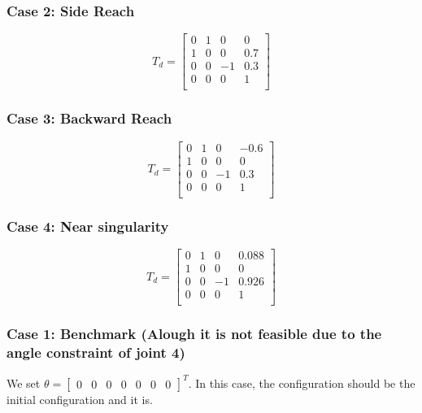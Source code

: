 \documentclass[english,10pt,a4paper]{book}
\begin{document}
    \subsubsection*{Case 2: Side Reach}
    $$T_d = \begin{bmatrix}
    	0 & 1 & 0 & 0\\
    	1 & 0 & 0 & 0.7\\
    	0 & 0 & -1 & 0.3 \\
    	0 & 0 & 0 & 1 \\
    \end{bmatrix}$$
    
    \subsubsection*{Case 3: Backward Reach}
    $$T_d = \begin{bmatrix}
    	0 & 1 & 0 & -0.6\\
    	1 & 0 & 0 & 0\\
    	0 & 0 & -1 & 0.3 \\
    	0 & 0 & 0 & 1 \\
    \end{bmatrix}$$
    
    \subsubsection*{Case 4: Near singularity}
        $$T_d = \begin{bmatrix}
    	0 & 1 & 0 & 0.088\\
    	1 & 0 & 0 & 0\\
    	0 & 0 & -1 & 0.926 \\
    	0 & 0 & 0 & 1 \\
    \end{bmatrix}$$
    
    
    \subsubsection*{Case 1: Benchmark (Alough it is not feasible due to the angle constraint of joint 4)}
    We set $\theta = \begin{bmatrix}
        0 & 0 & 0 & 0 & 0 & 0 & 0
    \end{bmatrix}^T$. In this case, the configuration should be the initial configuration and it is.
\end{document}
